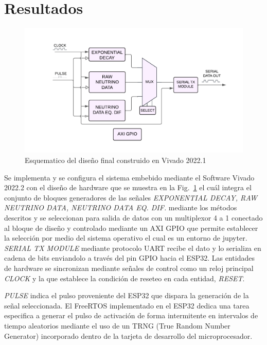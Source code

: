 \documentclass[conference]{IEEEtran}
\begin{document}
  




\section{Resultados}

        \begin{figure}[H]
        \centerline{\includegraphics[scale=0.55]{Diagrama_vivado.pdf}}
        \caption{Esquematico del diseño final construido en Vivado 2022.1}
        \label{vivado_sch}
        \end{figure}

Se implementa y se configura el sistema embebido mediante el Software Vivado 2022.2 con el diseño de hardware que se muestra en la Fig.~\ref{vivado_sch} el cuál integra el conjunto de bloques generadores de las señales \textit{EXPONENTIAL DECAY, RAW NEUTRINO DATA, NEUTRINO DATA EQ. DIF.} mediante los métodos descritos y se seleccionan para salida de datos con un multiplexor 4 a 1 conectado al bloque de diseño y controlado mediante un AXI GPIO que permite establecer la selección por medio del sistema operativo el cual es un entorno de jupyter. \textit{SERIAL TX MODULE} mediante protocolo UART recibe el dato y lo serializa en cadena de bits enviandolo a través del pin GPIO hacia el ESP32. Las entidades de hardware se sincronizan mediante señales de control como un reloj principal \textit{CLOCK} y la que establece la condición de reseteo en cada entidad, \textit{RESET}.

\textit{PULSE} indica el pulso proveniente del ESP32 que dispara la generación de la señal seleccionada. El FreeRTOS implementado en el ESP32 dedica una tarea especifica a generar el pulso de activación de forma intermitente en intervalos de tiempo aleatorios mediante el uso de un TRNG (True Random Number Generator) incorporado dentro de la tarjeta de desarrollo del microprocesador. 
\end{document}
